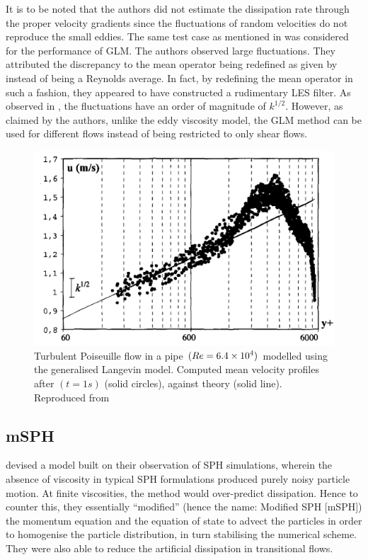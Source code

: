 It is to be noted that the authors did not estimate the dissipation rate through the proper velocity gradients since the fluctuations of random velocities do not reproduce the small eddies.
The same test case as mentioned in  was considered for the performance of GLM. 
The authors observed large fluctuations. They attributed the discrepancy to the mean operator being redefined as given by  instead of being a Reynolds average. In fact, by redefining the mean operator in such a fashion, they appeared to have constructed a rudimentary LES filter. 
As observed in , the fluctuations have an order of magnitude of $k^{1/2}$. However, as claimed by the authors, unlike the eddy viscosity model, the GLM method can be used for different flows instead of being restricted to only shear flows.
\begin{figure}[htbp!]
    \centering
    \includegraphics{Figures/research_papers/violeau2002-GLM-result.png}
    \caption{Turbulent Poiseuille flow in a pipe $(Re = 6.4 \times {10}^{4})$ modelled using the generalised Langevin model. Computed mean velocity profiles after $(t=1s)$ (solid circles), against theory (solid line). Reproduced from \cite{VIOLEAU2002}}
    \label{fig:violeau2002-GLM-result}
\end{figure}


\subsection{mSPH}
\cite{Adami2012} devised a model built on their observation of SPH simulations, wherein the absence of viscosity in typical SPH formulations produced purely noisy particle motion. At finite viscosities, the method would over-predict dissipation. Hence to counter this, they essentially ``modified'' (hence the name: Modified SPH [mSPH]) the momentum equation and the equation of state to advect the particles in order to homogenise the particle distribution, in turn stabilising the numerical scheme. They were also able to reduce the artificial dissipation in transitional flows.

